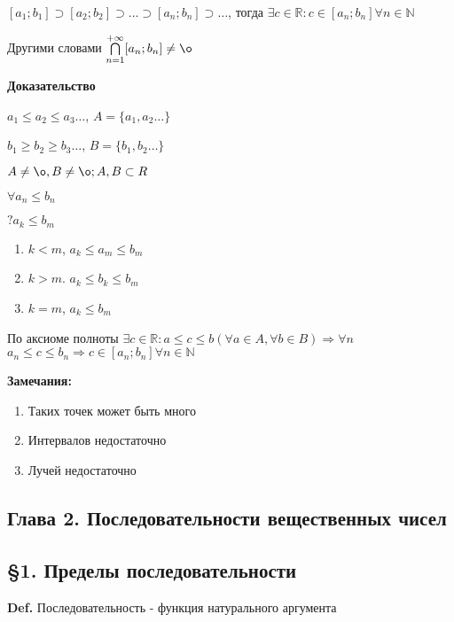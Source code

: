 \documentclass[14pt, letter paper]{article}
\begin{document}
$[a_1; b_1] \supset [a_2;b_2] \supset \ldots \supset [a_n;b_n] \supset \ldots$, тогда $\exists c \in \mathds{R}: c \in [a_n;b_n] \forall n \in \mathds{N}$

Другими словами $\bigcap\limits_{n=1}^{+ \infty} [a_n;b_n] \neq \o$

\begin{center}
    \textbf{Доказательство}
\end{center}

$a_1 \leq a_2 \leq a_3 \ldots$, $A = \{ a_1, a_2 \ldots \}$

$b_1 \geq b_2 \geq b_3 \ldots$, $B = \{ b_1, b_2 \ldots \}$

$A \neq \o, B \neq \o; A, B \subset R$

$\forall a_n \leq b_n$

$?a_k \leq b_m$
\begin{enumerate}
    \item $k < m$, $a_k \leq a_m \leq b_m$
    \item $k > m$. $a_k \leq b_k \leq b_m$
    \item $k = m$, $a_k \leq b_m$
\end{enumerate}

По аксиоме полноты $\exists c \in \mathds{R}: a \leq c \leq b (\forall a \in A, \forall b \in B) \Rightarrow \forall n$ $a_n \leq c \leq b_n \Rightarrow c \in [a_n;b_n] \forall n \in \mathds{N}$

\textbf{Замечания:}
\begin{enumerate}
    \item Таких точек может быть много
    \item Интервалов недостаточно
    \item Лучей недостаточно
\end{enumerate}

\begin{center}
    \section*{Глава 2. Последовательности вещественных чисел}

    \subsection*{\S 1. Пределы последовательности}
\end{center}

\textbf{Def.} Последовательность - функция натурального аргумента
\end{document}

